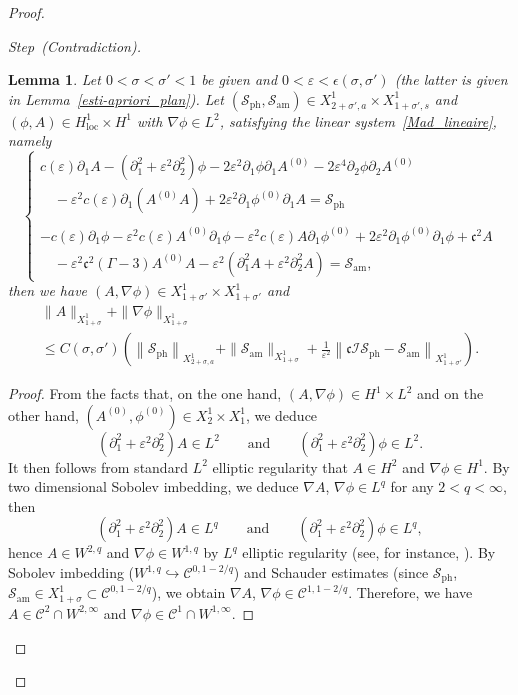 \documentclass[10pt]{amsart}
\newtheorem{lemm}[theo]{Lemma}\newtheorem{prop}[theo]{Proposition}\newtheorem{coro}[theo]{Corollary}\newtheorem{conj}[theo]{Conjecture}
\theoremstyle{definition}\newtheorem{defi}[theo]{Definition}\newtheorem{rema}[theo]{Remark}\newtheorem{exam}[theo]{Example}\newtheorem{exem}[theo]{Example}\newtheorem{nota}[theo]{Notation}
\newcommand*\p{\partial}
\newcommand{\amm}{\mathrm{am}}
\newcommand{\phl}{\mathrm{ph}}
\newcommand{\locc}{\mathrm{loc}}
\newcommand*\BC{\mathcal{C}}
\newcommand*\BI{\mathcal{I}}
\newcommand*\BS{\mathcal{S}}
\newcommand*\cs{{\mathfrak c}}
\newcommand*\ii{\infty}
\newcommand*\ls{\leqslant }
\newcommand*\e{\varepsilon}
\newcommand*\ep{\epsilon}
\newcommand*\s{\sigma}
\newcounter{stepcount}
\newenvironment{step}[1]{\refstepcounter{stepcount}\begin{proof}[{Step~\thestepcount}{\;(#1)}]}{\let\qed\relax\end{proof}}
\begin{document}
\begin{proof}
\begin{step}{{Contradiction}}
\begin{lemm}\label{H1suffit}
Let $ 0 < \s < \s' < 1 $ be given and $ 0 < \e < \ep(\s, \s') $ (the latter is given in Lemma~\ref{esti-apriori_plan}). Let $ (\BS_{\phl}, \BS_{\amm}) \in X^{1}_{2+\s', a} \times X^{1}_{1+\s', s} $ and $ (\phi, A) \in H^{1}_{\locc} \times H^1 $ with $ \nabla \phi \in L^{2} $, satisfying the linear system~\eqref{Mad_lineaire}, namely
\begin{equation*}
\left\{
\begin{array}{ll}
c(\e) \p_{1} A - \left(\p_{1}^2 + \e^2 \p^2_{2}\right) \phi - 2 \e^2 \p_{1} \phi \p_{1} A^{(0)} - 2 \e^4 \p_{2} \phi \p_{2} A^{(0)}
\\
\quad - \e^2 c(\e) \p_1 \left(A^{(0)} A\right) + 2 \e^2 \p_{1} \phi^{(0)} \p_{1} A = \BS_{\phl} \\ \ \\
- c(\e) \p_{1} \phi - \e^2 c(\e) A^{(0)} \p_1 \phi - \e^2 c(\e) A \p_1 \phi^{(0)} + 2 \e^2 \p_{1} \phi^{(0)} \p_{1} \phi + \cs^2 A
\\
\quad - \e^2 \cs^2 (\Gamma -3) A^{(0)} A - \e^2 \left(\p_{1}^2 A + \e^2 \p_{2}^2 A\right) = \BS_{\amm},
\end{array}\right.
\end{equation*}
then we have $ (A, \nabla \phi) \in X^{1}_{ 1+\s'} \times X^{1}_{ 1+ \s'} $ and
\begin{multline*}
\| A \|_{ X^1_{ 1+ \s} } + \| \nabla \phi \|_{ X^1_{1+ \s} }
\\
\ls C (\s, \s')
\left(
\left\| \BS_{\phl} \right\|_{ X^{1}_{ 2+\s, a} } + \| \BS_{\amm} \|_{ X^{ 1}_{1+\s} } + \frac{1}{\e^2} \left\| \cs \BI \BS_{\phl} - \BS_{\amm} \right\|_{ X^{1}_{1+\s'} }
\right).
\end{multline*}
\end{lemm}

\begin{proof}
From the facts that, on the one hand, $ (A, \nabla \phi) \in H^{1} \times L^{2} $ and on the other hand, $ (A^{(0)}, \phi^{(0)}) \in X^1_2 \times X^1_1 $, we deduce
\[
\left(\p_{1}^2 + \e^2 \p_{2}^2\right) A \in L^2
\qquad \text{and} \qquad \left(\p_{1}^2 + \e^2 \p_{2}^2\right) \phi \in L^2.
\]
It then follows from standard $ L^2 $ elliptic regularity that $ A \in H^2 $ and $ \nabla \phi \in H^1 $. By two dimensional Sobolev imbedding, we deduce $ \nabla A $, $ \nabla \phi \in L^q $ for any $ 2 < q < \ii $, then
\[
\left(\p_{1}^2 + \e^2 \p_{2}^2\right) A \in L^q
\qquad \text{and} \qquad \left(\p_{1}^2 + \e^2 \p_{2}^2\right) \phi \in L^q,
\]
hence $ A \in W^{2, q} $ and $ \nabla \phi \in W^{1, q} $ by $ L^q $ elliptic regularity (see, for instance, \cite[Theorem~9.9]{Gil-Tru}). By Sobolev imbedding ($ W^{1,q} \hookrightarrow \BC^{0, 1-2/q} $) and Schauder estimates (since $ \BS_{\phl} $, $ \BS_{\amm} \in X^1_{1 +\s} \subset \BC^{0, 1-2/q }$), we obtain $ \nabla A $, $ \nabla \phi \in \BC^{1, 1-2/q} $. Therefore, we have $ A \in \BC^2 \cap W^{2,\ii} $ and $ \nabla \phi \in \BC^1 \cap W^{1,\ii} $.


\end{proof}
\end{step}
\end{proof}
\end{document}
